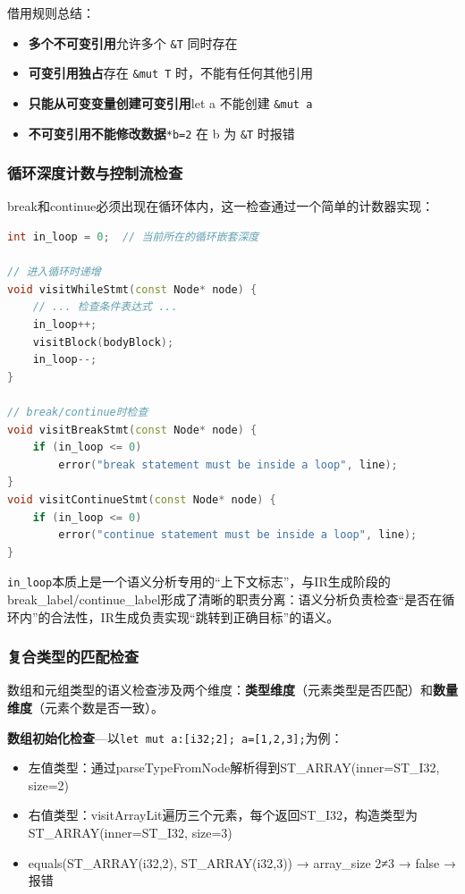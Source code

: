 \documentclass[12pt,a4paper]{ctexart}
\begin{document}
借用规则总结：
\begin{itemize}
    \item \textbf{多个不可变引用}允许多个 \texttt{\&T} 同时存在
    \item \textbf{可变引用独占}存在 \texttt{\&mut T} 时，不能有任何其他引用
    \item \textbf{只能从可变变量创建可变引用}let a 不能创建 \texttt{\&mut a}
    \item \textbf{不可变引用不能修改数据}\texttt{*b=2} 在 b 为 \texttt{\&T} 时报错
\end{itemize}

\subsubsection{循环深度计数与控制流检查}

break和continue必须出现在循环体内，这一检查通过一个简单的计数器实现：

\begin{lstlisting}[language=C++, caption={in\_loop计数器管理}]
int in_loop = 0;  // 当前所在的循环嵌套深度

// 进入循环时递增
void visitWhileStmt(const Node* node) {
    // ... 检查条件表达式 ...
    in_loop++;
    visitBlock(bodyBlock);
    in_loop--;
}

// break/continue时检查
void visitBreakStmt(const Node* node) {
    if (in_loop <= 0)
        error("break statement must be inside a loop", line);
}
void visitContinueStmt(const Node* node) {
    if (in_loop <= 0)
        error("continue statement must be inside a loop", line);
}
\end{lstlisting}

\texttt{in\_loop}本质上是一个语义分析专用的``上下文标志''，与IR生成阶段的break\_label/continue\_label形成了清晰的职责分离：语义分析负责检查``是否在循环内''的合法性，IR生成负责实现``跳转到正确目标''的语义。

\subsubsection{复合类型的匹配检查}

数组和元组类型的语义检查涉及两个维度：\textbf{类型维度}（元素类型是否匹配）和\textbf{数量维度}（元素个数是否一致）。

\textbf{数组初始化检查}—以\texttt{let mut a:[i32;2]; a=[1,2,3];}为例：
\begin{itemize}
    \item 左值类型：通过parseTypeFromNode解析得到ST\_ARRAY(inner=ST\_I32, size=2)
    \item 右值类型：visitArrayLit遍历三个元素，每个返回ST\_I32，构造类型为ST\_ARRAY(inner=ST\_I32, size=3)
    \item equals(ST\_ARRAY(i32,2), ST\_ARRAY(i32,3)) → array\_size 2≠3 → false → 报错
\end{itemize}
\end{document}

